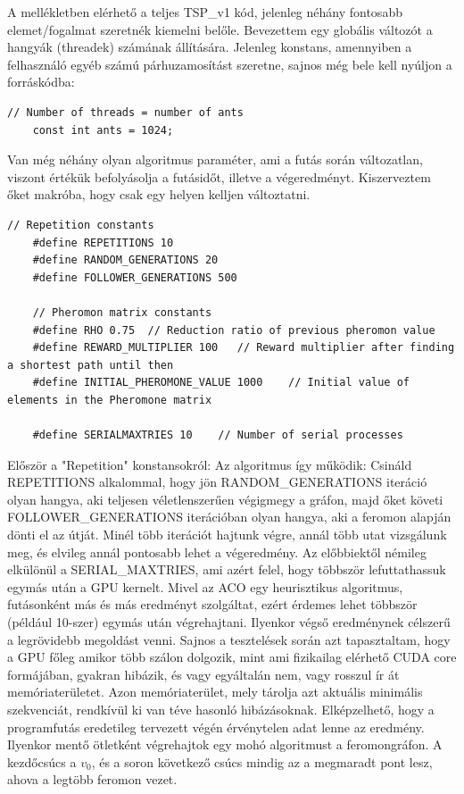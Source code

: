 A mellékletben elérhető a teljes TSP\_v1 kód, jelenleg néhány fontosabb elemet/fogalmat szeretnék kiemelni belőle.
Bevezettem egy globális változót a hangyák (threadek) számának állítására. Jelenleg konstans, amennyiben a felhasználó egyéb számú párhuzamosítást szeretne, sajnos még bele kell nyúljon a forráskódba:

\begin{lstlisting}[style=CStyle]
	// Number of threads = number of ants
	const int ants = 1024;
\end{lstlisting}

Van még néhány olyan algoritmus paraméter, ami a futás során változatlan, viszont értékük befolyásolja a futásidőt, illetve a végeredményt. Kiszerveztem őket makróba, hogy csak egy helyen kelljen változtatni.

\begin{lstlisting}[style=CStyle]
	// Repetition constants
	#define REPETITIONS 10
	#define RANDOM_GENERATIONS 20
	#define FOLLOWER_GENERATIONS 500
	
	// Pheromon matrix constants
	#define RHO 0.75  // Reduction ratio of previous pheromon value
	#define REWARD_MULTIPLIER 100   // Reward multiplier after finding a shortest path until then
	#define INITIAL_PHEROMONE_VALUE 1000    // Initial value of elements in the Pheromone matrix
	
	#define SERIALMAXTRIES 10    // Number of serial processes
\end{lstlisting}

Először a "Repetition" konstansokról: Az algoritmus így működik: Csináld REPETITIONS alkalommal, hogy jön RANDOM\_GENERATIONS iteráció olyan hangya, aki teljesen véletlenszerűen végigmegy a gráfon, majd őket követi FOLLOWER\_GENERATIONS iterációban olyan hangya, aki a feromon alapján dönti el az útját. Minél több iterációt hajtunk végre, annál több utat vizsgálunk meg, és elvileg annál pontosabb lehet a végeredmény.
Az előbbiektől némileg elkülönül a SERIAL\_MAXTRIES, ami azért felel, hogy többször lefuttathassuk egymás után a GPU kernelt. Mivel az ACO egy heurisztikus algoritmus, futásonként más és más eredményt szolgáltat, ezért érdemes lehet többször (például 10-szer) egymás után végrehajtani. Ilyenkor végső eredménynek célszerű a legrövidebb megoldást venni. Sajnos a tesztelések során azt tapasztaltam, hogy a GPU főleg amikor több szálon dolgozik, mint ami fizikailag elérhető CUDA core formájában, gyakran hibázik, és vagy egyáltalán nem, vagy rosszul ír át memóriaterületet. Azon memóriaterület, mely tárolja azt aktuális minimális szekvenciát, rendkívül ki van téve hasonló hibázásoknak. Elképzelhető, hogy a programfutás eredetileg tervezett végén érvénytelen adat lenne az eredmény. Ilyenkor mentő ötletként végrehajtok egy mohó algoritmust a feromongráfon. A kezdőcsúcs a \(v_{0}\), és a soron következő csúcs mindig az a megmaradt pont lesz, ahova a legtöbb feromon vezet.

